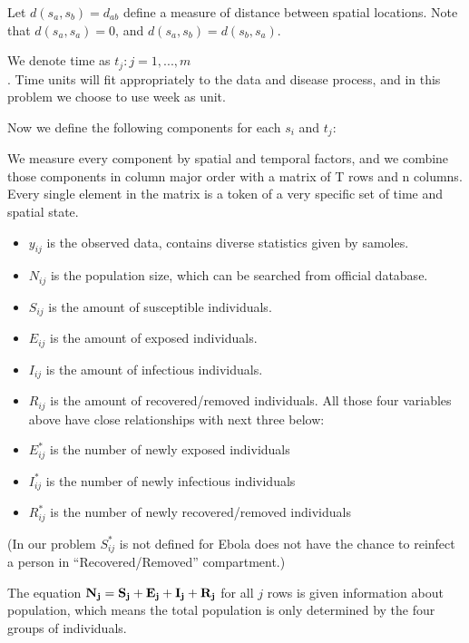 \documentclass[12pt]{article}
\begin{document}
Let $d(s_a, s_b) = d_{ab}$ define a measure of distance between spatial locations. Note that $d(s_a, s_a) = 0$, and $d(s_a, s_b) = d(s_b, s_a)$.
        
        We denote time as ${t_j : j = 1, ...,m}$ \\. Time units will fit appropriately to the data and disease process, and in this problem we choose to use week as unit.


 Now we define the following components for each $s_i$ and $t_j$:

We measure every component by spatial and temporal factors, and we combine those components in column major order with a matrix of T rows and n columns. Every single element in the matrix is a token of a very specific set of time and spatial state. 

\begin{itemize}
            \item {$y_{ij}$} is the observed data, contains diverse statistics given by samoles.
            \item {${N_{ij}}$} is the population size, which can be searched from official database.
            \item {${S_{ij}}$} is the amount of susceptible individuals.
            \item {${E_{ij}}$} is the amount of exposed individuals.
            \item {${I_{ij}}$} is the amount of infectious individuals.
            \item {${R_{ij}}$} is the amount of recovered/removed individuals. All those four variables above have close relationships with next three below: 
            
            \item {${E^*_{ij}}$} is the number of newly exposed individuals
            \item {${I^*_{ij}}$} is the number of newly infectious individuals
            \item {${R^*_{ij}}$} is the number of newly recovered/removed individuals
        \end{itemize}
        
(In our problem {$S^*_{ij}$} is not defined for Ebola does not have the chance to reinfect a person in ``Recovered/Removed'' compartment.)

The equation {$\bf{N_j} = \bf{S_j + E_j + I_j + R_j}$} for all $j$ rows is given information about population, which means the total population is only determined by the four groups of individuals. 
\end{document}
